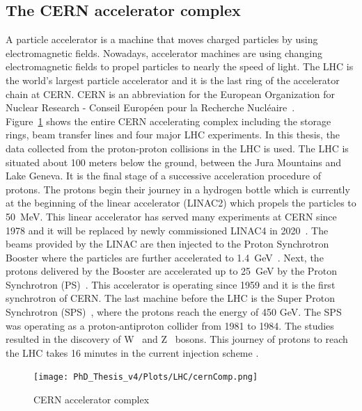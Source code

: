 \subsection{The CERN accelerator complex}
A particle accelerator is a machine that moves charged particles by using electromagnetic fields. Nowadays, accelerator machines are using changing electromagnetic fields to propel particles to nearly the speed of light. 
The LHC is the world's largest particle accelerator and it is the last ring of the accelerator chain at CERN. CERN is an abbreviation for the European Organization for Nuclear Research - Conseil Europ{\'e}en pour la Recherche Nucl{\'e}aire~\cite{CERNWB}.\\
Figure~\ref{fig:CERN_complex} shows the entire CERN accelerating complex including the storage rings, beam transfer lines and four major LHC experiments.
In this thesis, the data collected from the proton-proton collisions in the LHC is used. The LHC is situated about 100 meters below the ground, between the Jura Mountains and Lake Geneva. It is the final stage of a successive acceleration procedure of protons. The protons begin their journey in a hydrogen bottle which is currently at the beginning of the linear accelerator (LINAC2) which propels the particles to 50~MeV. This linear accelerator has served many experiments at CERN since 1978 and it will be replaced by newly commissioned LINAC4  in 2020~\cite{LINAC2}. The beams provided by the LINAC are then injected to the Proton Synchrotron Booster where the particles are further accelerated to 1.4~GeV~\cite{Booster}. Next, the protons delivered by the Booster are accelerated up to 25~GeV by the Proton Synchrotron (PS)~\cite{PS}. This accelerator is operating since 1959 and it is the first synchrotron of CERN.
The last machine before the LHC is the Super Proton Synchrotron (SPS)~\cite{SPS}, where the protons reach the energy of 450 GeV. The SPS was operating as a proton-antiproton collider from 1981 to 1984. The studies resulted in the discovery of W~\cite{Wboson} and Z~\cite{Zboson} bosons. This journey of protons to reach the LHC takes 16 minutes in the current injection scheme \cite{LHCDR}.
\begin{figure}
\begin{center}
\texttt{[image: PhD\_Thesis\_v4/Plots/LHC/cernComp.png]}
\caption{\label{fig:CERN_complex} CERN accelerator complex \cite{CERN_complex} }
\end{center}
\end{figure}
